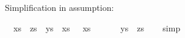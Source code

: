 \begin{isabellebody}
%
\endisatagproof
{\isafoldproof}%
%
\isadelimproof
%
\endisadelimproof
%
\begin{isamarkuptext}%
Simplification in assumption:%
\end{isamarkuptext}\isamarkuptrue%
\isamarkupfalse%
\ {\isachardoublequoteopen}{\isasymlbrakk}\ xs\ {\isacharat}{\kern0pt}\ zs\ {\isacharequal}{\kern0pt}\ ys\ {\isacharat}{\kern0pt}\ xs{\isacharsemicolon}{\kern0pt}\ {\isacharbrackleft}{\kern0pt}{\isacharbrackright}{\kern0pt}\ {\isacharat}{\kern0pt}\ xs\ {\isacharequal}{\kern0pt}\ {\isacharbrackleft}{\kern0pt}{\isacharbrackright}{\kern0pt}\ {\isacharat}{\kern0pt}\ {\isacharbrackleft}{\kern0pt}{\isacharbrackright}{\kern0pt}\ {\isasymrbrakk}\ {\isasymLongrightarrow}\ ys\ {\isacharequal}{\kern0pt}\ zs{\isachardoublequoteclose}\isanewline
%
\isadelimproof
\ \ %
\endisadelimproof
%
\isatagproof
{}\isamarkupfalse%
\ simp\isanewline
\ \ \isamarkupfalse%
%
\endisatagproof
{\isafoldproof}%
%
\isadelimproof
\isanewline
%
\endisadelimproof
%
\isadelimtheory
\isanewline
%
\endisadelimtheory
%
\isatagtheory
{}\isamarkupfalse%
%
\endisatagtheory
{\isafoldtheory}%
%
\isadelimtheory
%
\endisadelimtheory
%
\end{isabellebody}%
\endinput
